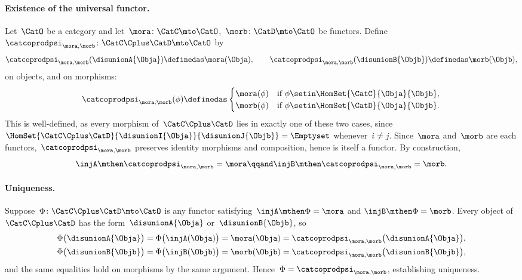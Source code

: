 \begin{example}
    \paragraph{Existence of the universal functor.}
    Let~$\CatO$ be a category and let~$\mora \colon \CatC \mto \CatO$,~$\morb \colon \CatD \mto \CatO$ be functors.
    Define~$\catcoprodpsi_{\mora,\morb} \colon \CatC \Cplus \CatD \mto \CatO$ by
    \begin{equation}
        \catcoprodpsi_{\mora,\morb}(\disunionA{\Obja}) \definedas \mora(\Obja),
        \qquad
        \catcoprodpsi_{\mora,\morb}(\disunionB{\Objb}) \definedas \morb(\Objb),
    \end{equation}
    on objects, and on morphisms:
    \begin{equation}
        \catcoprodpsi_{\mora,\morb}(\phi) \definedas
        \begin{cases}
            \mora(\phi) & \text{if } \phi \setin \HomSet{\CatC}{\Obja}{\Objb}, \\
            \morb(\phi) & \text{if } \phi \setin \HomSet{\CatD}{\Obja}{\Objb}.
        \end{cases}
    \end{equation}
    This is well-defined, as every morphism of~$\CatC \Cplus \CatD$ lies in exactly one of these two cases, since~$\HomSet{\CatC \Cplus \CatD}{\disunionI{\Obja}}{\disunionJ{\Objb}} = \Emptyset$ whenever~$i \neq j$.
    Since~$\mora$ and~$\morb$ are each functors,~$\catcoprodpsi_{\mora,\morb}$ preserves identity morphisms and composition, hence is itself a functor.
    By construction,
    \begin{equation}
        \injA \mthen \catcoprodpsi_{\mora,\morb} = \mora
        \qqand
        \injB \mthen \catcoprodpsi_{\mora,\morb} = \morb.
    \end{equation}

    \paragraph{Uniqueness.}
    Suppose~$\Phi \colon \CatC \Cplus \CatD \mto \CatO$ is any functor satisfying~$\injA \mthen \Phi = \mora$ and $\injB \mthen \Phi = \morb$.
    Every object of~$\CatC \Cplus \CatD$ has the form~$\disunionA{\Obja}$ or~$\disunionB{\Objb}$, so
    \begin{align}
        \Phi\bigl(\disunionA{\Obja}\bigr)
         & = \Phi\bigl(\injA(\Obja)\bigr)
        = \mora(\Obja)
        = \catcoprodpsi_{\mora,\morb}\bigl(\disunionA{\Obja}\bigr), \\
        \Phi\bigl(\disunionB{\Objb}\bigr)
         & = \Phi\bigl(\injB(\Objb)\bigr)
        = \morb(\Objb)
        = \catcoprodpsi_{\mora,\morb}\bigl(\disunionB{\Objb}\bigr),
    \end{align}
    and the same equalities hold on morphisms by the same argument.
    Hence~$\Phi = \catcoprodpsi_{\mora,\morb}$, establishing uniqueness.
\end{example}